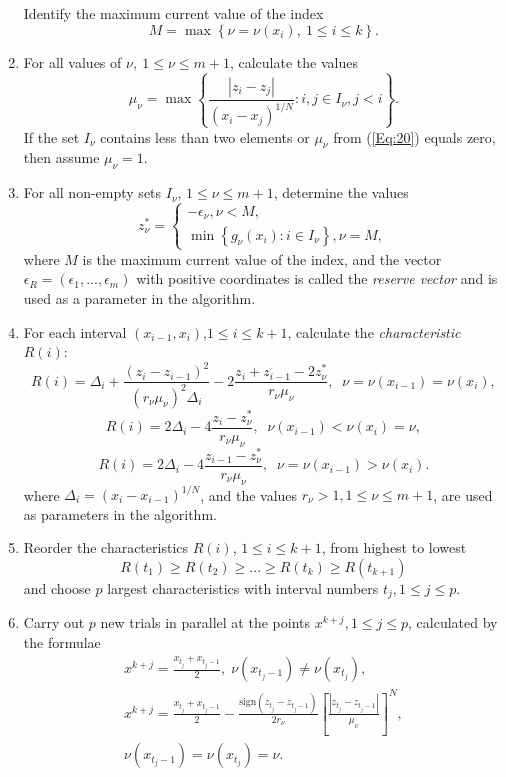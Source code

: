 \documentclass{llncs}
\begin{document}
\begin{enumerate}
Identify the maximum current value of the index
\begin{equation}\label{Eq:19}
M=\max \left\{\nu = \nu(x_i), \ 1\leq i \leq k\right\}.
\end{equation}
\item
For all values of $\nu, \ 1\leq \nu \leq m+1$, calculate the values  
\begin{equation}\label{Eq:20}
\mu_\nu = \max \left\{ \frac{\left|z_i-z_j\right|}{\left(x_i-x_j\right)^{1/N}} : i,j \in I_\nu, 
j<i\right\}.
\end{equation}
If the set $I_\nu$ contains less than two elements or $\mu_\nu$ from (\ref{Eq:20}) equals zero, 
then assume $\mu_\nu=1$.
\item
For all non-empty sets $I_\nu$, $1 \leq \nu \leq m+1$, determine the values
\begin{equation}\label{Eq:21}
  z^\ast_\nu =  
   \begin{cases}
    -\epsilon_\nu,  \nu < M, \\
    \min{\left\{g_\nu(x_i):i\in I_\nu\right\}}, \nu = M,
   \end{cases}
\end{equation}
where $M$ is the maximum current value of the index, and the vector $\epsilon _R=\left(\epsilon_1,...,\epsilon_m\right)$ with positive coordinates is called the \textit{reserve vector} and is used as a parameter in the 
algorithm.
\item
For each interval $(x_{i-1},x_i)$,$1 \leq i \leq k+1$, calculate the \textit{characteristic} $R(i)$: 
\[
R(i)=\Delta_i+ \frac{(z_i-z_{i-1})^2}{(r_\nu\mu_\nu)^2\Delta_i}-2\frac{z_i+z_{i-1}-
2z^\ast_\nu}{r_\nu\mu_\nu},\;\; \nu=\nu(x_{i-1})=\nu(x_i),
\]
\[
R(i)= 2\Delta_i-4\frac{z_i-z^\ast_\nu}{r_\nu\mu_\nu},\;\; \nu(x_{i-1})<\nu(x_i)=\nu,
\]
\[
R(i)= 2\Delta_i-4\frac{z_{i-1}-z^\ast_\nu}{r_\nu\mu_\nu},\;\; \nu = \nu(x_{i-1})>\nu(x_i).
\]
where $\Delta_i=(x_i-x_{i-1})^{1/N}$, and the values $r_\nu>1, 1\leq\nu\leq m+1$, are used as 
parameters in the algorithm.
\item
Reorder the characteristics $R(i)$, $1\leq i \leq k+1$, from highest to lowest 	
\begin{equation}\label{Eq:23}
R(t_1)\geq R(t_2)\geq ... \geq R(t_{k})\geq R(t_{k+1})
\end{equation}
and choose $p$ largest characteristics with interval numbers $t_j, 1\leq j \leq p$.
\item
Carry out $p$ new trials in parallel at the points $x^{k+j}, 1 \leq j \leq p$, calculated by the 
formulae
\begin{gather*}
x^{k+j}=\frac{x_{t_j}+x_{t_j-1}}{2}, \; \nu(x_{t_j-1})\neq \nu(x_{t_j}),\\
x^{k+j}=\frac{x_{t_j}+x_{t_j-1}}{2}- \frac{\mathrm{sign}(z_{t_j}-z_{t_j-
1})}{2r_\nu}\left[\frac{\left|z_{t_j}-z_{t_j-1}\right|}{\mu_\nu}\right]^N, \\
\nu(x_{t_j-1})=\nu(x_{t_j})=\nu.
\end{gather*}

\end{enumerate}
\end{document}

